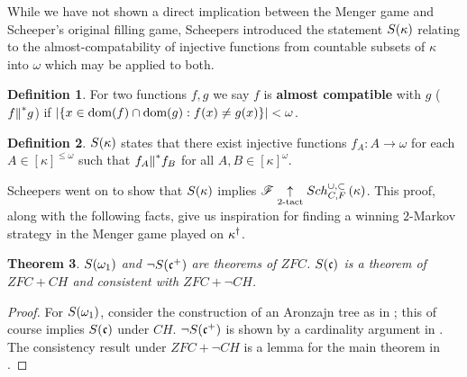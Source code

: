 \documentclass{amsart}
\newtheorem{theorem}{Theorem}[section]
\theoremstyle{definition}
\newtheorem{definition}[theorem]{Definition}
\begin{document}
While we have not shown a direct implication between the Menger game and
Scheeper's original filling game, Scheepers introduced the statement
\(S(\kappa)\) relating to the almost-compatability of injective functions
from countable subsets of \(\kappa\) into \(\omega\) which may be applied to
both.

\begin{definition}
  For two functions \(f,g\) we say \(f\) is \textbf{almost compatible} with
  \(g\) (\(f{\parallel}^* g\)) if \(|\{x\in\textrm{dom}(f)\cap\textrm{dom}(g):f(x)\not=g(x)\}|<\omega\).
\end{definition}

\begin{definition}
  \(S(\kappa)\) states that there exist injective functions
  \(f_A:A\to\omega\) for each \(A\in[\kappa]^{\leq\omega}\) such that
  \(f_A{\parallel}^* f_B\) for all \(A,B\in[\kappa]^\omega\).
\end{definition}

Scheepers went on to show that \(S(\kappa)\) implies
\(\mathscr{F} \underset{2\text{-tact}}{\uparrow} Sch^{\cup,\subset}_{C,F}\left({\kappa}\right)\). This proof, along with the following
facts, give us inspiration for
finding a winning \(2\)-Markov strategy in the Menger game played on
\(\kappa^\dagger\).

\begin{theorem}
  \(S(\omega_1)\) and \(\neg S(\mathfrak{c}^+)\)
  are theorems of \(ZFC\).
  \(S(\mathfrak{c})\) is a theorem of \(ZFC+CH\) and consistent with
  \(ZFC+\neg CH\).
\end{theorem}

\begin{proof}
  For \(S(\omega_1)\), consider the construction of an Aronzajn tree
  as in \cite{MR597342}; this of course
  implies \(S(\mathfrak{c})\) under \(CH\).
  \(\neg S(\mathfrak{c}^+)\) is shown by a cardinality argument
  in \cite{MR1129143}.
  The consistency result under \(ZFC+\neg CH\)
  is a lemma for the main theorem in \cite{MR1129143}.
\end{proof}
\end{document}
